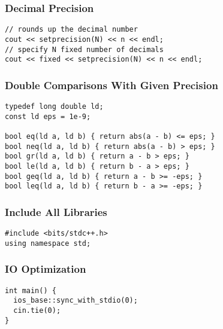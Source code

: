\documentclass[twoside]{article}
\begin{document}
\begin{multicols*}{2}
\subsubsection*{Decimal Precision}
\begin{verbatim}
// rounds up the decimal number
cout << setprecision(N) << n << endl;
// specify N fixed number of decimals
cout << fixed << setprecision(N) << n << endl;
\end{verbatim}

\subsubsectionfont{\large\bfseries\sffamily\underline}
\subsubsection*{Double Comparisons With Given Precision}
\begin{verbatim}
typedef long double ld;
const ld eps = 1e-9;

bool eq(ld a, ld b) { return abs(a - b) <= eps; }
bool neq(ld a, ld b) { return abs(a - b) > eps; }
bool gr(ld a, ld b) { return a - b > eps; }
bool le(ld a, ld b) { return b - a > eps; }
bool geq(ld a, ld b) { return a - b >= -eps; }
bool leq(ld a, ld b) { return b - a >= -eps; }
\end{verbatim}

\subsubsectionfont{\large\bfseries\sffamily\underline}
\subsubsection*{Include All Libraries}
\begin{verbatim}
#include <bits/stdc++.h>
using namespace std;
\end{verbatim}

\subsubsectionfont{\large\bfseries\sffamily\underline}
\subsubsection*{IO Optimization}
\begin{verbatim}
int main() {
  ios_base::sync_with_stdio(0);
  cin.tie(0);
}
\end{verbatim}

\subsubsectionfont{\large\bfseries\sffamily\underline}

\end{multicols*}
\end{document}
